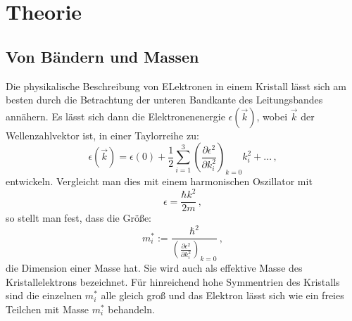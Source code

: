 \section{Theorie}
\subsection{Von Bändern und Massen}%
Die physikalische Beschreibung von ELektronen in einem Kristall lässt sich am besten durch die Betrachtung der unteren Bandkante des Leitungsbandes annähern. Es lässt sich dann die Elektronenenergie $\epsilon(\vec{k})$, wobei $\vec{k}$ der Wellenzahlvektor ist, in einer Taylorreihe zu:
\begin{equation}
\epsilon(\vec{k})=\epsilon\left(0\right)+\frac{1}{2}\sum_{i=1}^3\left(\frac{\partial\epsilon^2}{\partial k_i^2}\right)_{k=0}k_i^2+...\,,
\end{equation}
entwickeln.
Vergleicht man dies mit einem harmonischen Oszillator mit
\begin{equation}
  \epsilon=\frac{\hbar k^2}{2m}\,,
\end{equation}
so stellt man fest, dass die Größe:
\begin{equation}
m_i^*:=\frac{\hbar^2}{\left(\frac{\partial\epsilon^2}{\partial k_i^2}\right)_{k=0}}\,,
\end{equation}
die Dimension einer Masse hat. Sie wird auch als effektive Masse des Kristallelektrons bezeichnet.
Für hinreichend hohe Symmentrien des Kristalls sind die einzelnen $m_i^*$ alle gleich groß und das Elektron lässt sich wie ein freies Teilchen mit Masse $m_i^*$ behandeln.
